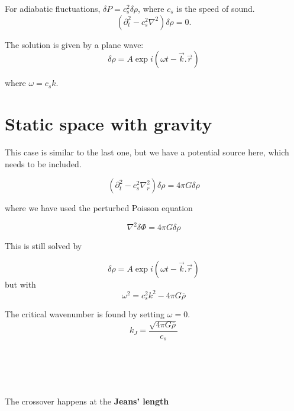 \documentclass[a4,12pt,oneside]{report}
\begin{document}
	For adiabatic fluctuations, $ \delta P = c_s^2 \delta \rho $, where $ c_s$ is the speed of sound.
	\begin{equation}\label{key}
	(\partial_t^2 - c_s^2\nabla^2) \delta \rho = 0.
	\end{equation}
	
	The solution is given by a plane wave:
	\begin{equation}\label{key}
	\delta \rho = A \exp i(\omega t - \vec{k}.\vec{r})
	\end{equation}
	
	where $ \omega = c_s k  $.
	\begin{center}
	\end{center}
	
	\section{Static space with gravity}
	This case is similar to the last one, but we have a potential source here, which needs to be included. 
	
	\begin{equation}\label{key}
	(\partial_t^2 - c_s^2 \nabla_r^2)\delta \rho = 4 \pi G \delta \rho
	\end{equation}
	
	where we have used the perturbed Poisson equation
	
	\begin{equation}\label{key}
	\nabla^2 \delta \Phi = 4 \pi G \delta \rho
	\end{equation}
	
	This is still solved by 
	
	\begin{equation}\label{key}
	\delta \rho = A \exp i(\omega t - \vec{k}.\vec{r})
	\end{equation}
	but with
	\begin{equation}\label{key}
	\omega^2 = c_s^2 k ^2 - 4 \pi G \overline{\rho}
	\end{equation}
	
	The critical wavenumber is found by setting $ \omega = 0 $.
	\begin{equation}\label{key}
	k_J = \frac{\sqrt{4 \pi G \overline{\rho}}}{c_s}
	\end{equation}
	
	\\\\
   	\\\\	
	The crossover happens at the {\bf Jeans' length}
	
\end{document}
